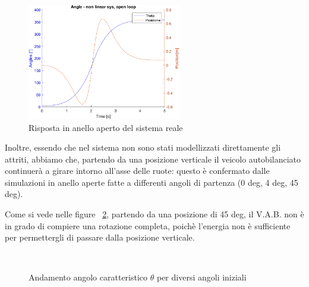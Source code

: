 \begin{figure}[H]
	\centering   	
	\includegraphics[width=0.6\textwidth]{Immagini/open_loop_response_non_linear.png}
	\caption{Risposta in anello aperto del sistema reale}
	\label{fig:open_loop_response_non_linear}
\end{figure}

Inoltre, essendo che nel sistema non sono stati modellizzati direttamente gli attriti, abbiamo che, partendo da una posizione verticale il veicolo autobilanciato continuerà a girare intorno all'asse delle ruote: questo è confermato dalle simulazioni in anello aperte fatte a differenti angoli di partenza (0 deg, 4 deg, 45 deg).

Come si vede nelle figure ~\ref{fig:angle_theta}, partendo da una posizione di 45 deg, il V.A.B. non è in grado di compiere una rotazione completa, poichè l'energia non è sufficiente per permettergli di passare dalla posizione verticale.

\begin{figure}[H]
	\centering
	 \quad
	 \\
	\caption{Andamento angolo caratteristico $\theta$ per diversi angoli iniziali}
	\label{fig:angle_theta}
\end{figure}


